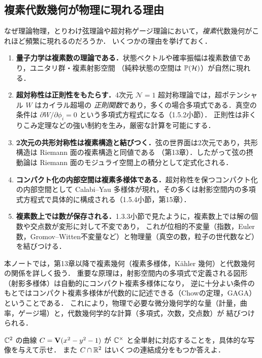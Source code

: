 \subsection{複素代数幾何が物理に現れる理由}

なぜ理論物理，とりわけ弦理論や超対称ゲージ理論において，\emph{複素}代数幾何がこれほど頻繁に現れるのだろうか．
いくつかの理由を挙げておく．

\begin{enumerate}
  \item \textbf{量子力学は複素数の理論である．}状態ベクトルや確率振幅は複素数値であり，ユニタリ群・複素射影空間
        （純粋状態の空間は $\mathbb{P}(\mathcal H)$）が自然に現れる．
  \item \textbf{超対称性は正則性をもたらす．}4次元 $\mathcal N=1$ 超対称理論では，超ポテンシャル $W$ はカイラル超場の
        \emph{正則関数}であり，多くの場合多項式である．真空の条件は $\partial W/\partial\phi_i=0$ という多項式方程式になる（1.5.2小節）．
        正則性は非くりこみ定理などの強い制約を生み，厳密な計算を可能にする．
  \item \textbf{2次元の共形対称性は複素構造と結びつく．}弦の世界面は2次元であり，共形構造は Riemann 面の複素構造と同値である
        （第13章）．したがって弦の摂動論は Riemann 面のモジュライ空間上の積分として定式化される．
  \item \textbf{コンパクト化の内部空間は複素多様体である．}超対称性を保つコンパクト化の内部空間として
        Calabi--Yau 多様体が現れ，その多くは射影空間内の多項式方程式で具体的に構成される（1.5.4小節，第15章）．
  \item \textbf{複素数上では数が保存される．}1.3.3小節で見たように，複素数上では解の個数や交点数が変形に対して不変であり，
        これが位相的不変量（指数，Euler数，Gromov--Witten不変量など）と物理量（真空の数，粒子の世代数など）を結びつける．
\end{enumerate}

\begin{physbox}[本ノートにおける複素数の役割]
本ノートでは，第13章以降で複素幾何（複素多様体，Kähler 幾何）と代数幾何の関係を詳しく扱う．
重要な原理は，射影空間内の多項式で定義される図形（射影多様体）は自動的にコンパクト複素多様体になり，
逆に十分よい条件のもとではコンパクト複素多様体が代数的に記述できる（Chowの定理，GAGA）ということである．
これにより，物理で必要な微分幾何学的な量（計量，曲率，ゲージ場）と，代数幾何学的な計算（多項式，次数，交点数）が
結びつけられる．
\end{physbox}

$\mathbb{C}^2$ の曲線 $C=\mathbf{V}(x^2-y^2-1)$ が $\mathbb{C}^\times$ と全単射に対応することを，具体的な写像を与えて示せ．
また $C\cap\mathbb{R}^2$ はいくつの連結成分をもつか答えよ．

